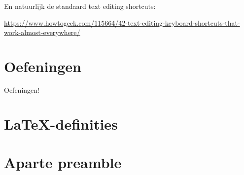 \documentclass[
    dutch,
    everyoneauthor=true,
    defaultSlideCollection=vincent,
    handout
]{../../cursuspresentatie}
\let\placetarget\relax
\let\placetarget\relax
\begin{document}
\begin{frame}
    En natuurlijk de standaard text editing shortcuts:

    \url{https://www.howtogeek.com/115664/42-text-editing-keyboard-shortcuts-that-work-almost-everywhere/}
\end{frame}







\section{Oefeningen}

\def\placetarget{\hypertarget{oefeningen1}{}}

\begin{frame}
    \begin{center}
        {\LARGE Oefeningen!}
        \vspace{30pt}

        

    \end{center}
\end{frame}



\section{\LaTeX-definities}

\def\placetarget{\hypertarget{LaTeXDefinities}{}}


\section{Aparte preamble}

\def\placetarget{\hypertarget{apartePreamble}{}}
\end{document}
